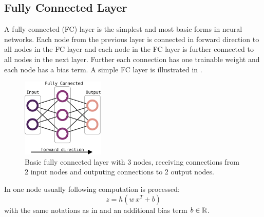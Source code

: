 \subsection{Fully Connected Layer}
A fully connected (FC) layer is the simplest and most basic forms in neural networks.
Each node from the previous layer is connected in forward direction to all nodes in the FC layer and each node in the FC layer is further connected to all nodes in the next layer.
Further each connection has one trainable weight and each node has a bias term.
A simple FC layer is illustrated in .
\begin{figure}[!ht]
  \centering
    \includegraphics[width=0.35\textwidth]{./4_nn/figs/nn_theory_fc.eps}
  \caption{Basic fully connected layer with 3 nodes, receiving connections from 2 input nodes and outputing connections to 2 output nodes.}
  \label{fig:nn_theory_fc}
\end{figure}
\FloatBarrier
\noindent
In one node usually following computation is processed:
\begin{equation}
  z = h(w \, x^T + b)
\end{equation}
with the same notations as in  and an additional bias term $b \in \mathbb{R}$.



